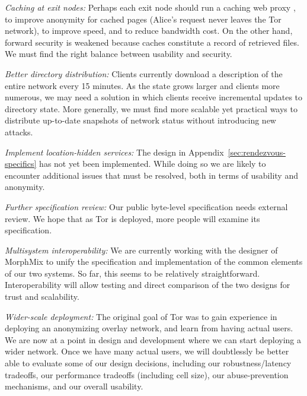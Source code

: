 \documentclass[times,10pt,twocolumn]{article}
\begin{document}

\emph{Caching at exit nodes:} Perhaps each exit node should run a
caching web proxy \cite{shsm03}, to improve anonymity for cached pages
(Alice's request never
leaves the Tor network), to improve speed, and to reduce bandwidth cost.
On the other hand, forward security is weakened because caches
constitute a record of retrieved files.  We must find the right
balance between usability and security.

\emph{Better directory distribution:}
Clients currently download a description of
the entire network every 15 minutes. As the state grows larger
and clients more numerous, we may need a solution in which
clients receive incremental updates to directory state.
More generally, we must find more
scalable yet practical ways to distribute up-to-date snapshots of
network status without introducing new attacks.

\emph{Implement location-hidden services:} The design in
Appendix~\ref{sec:rendezvous-specifics} has not yet been implemented.
While doing
so we are likely to encounter additional issues that must be resolved,
both in terms of usability and anonymity.

\emph{Further specification review:} Our public
byte-level specification \cite{tor-spec} needs
external review.  We hope that as Tor
is deployed, more people will examine its
specification.

\emph{Multisystem interoperability:} We are currently working with the
designer of MorphMix to unify the specification and implementation of
the common elements of our two systems. So far, this seems
to be relatively straightforward.  Interoperability will allow testing
and direct comparison of the two designs for trust and scalability.

\emph{Wider-scale deployment:} The original goal of Tor was to
gain experience in deploying an anonymizing overlay network, and
learn from having actual users.  We are now at a point in design
and development where we can start deploying a wider network.  Once
we have many actual users, we will doubtlessly be better
able to evaluate some of our design decisions, including our
robustness/latency tradeoffs, our performance tradeoffs (including
cell size), our abuse-prevention mechanisms, and
our overall usability.
\end{document}
